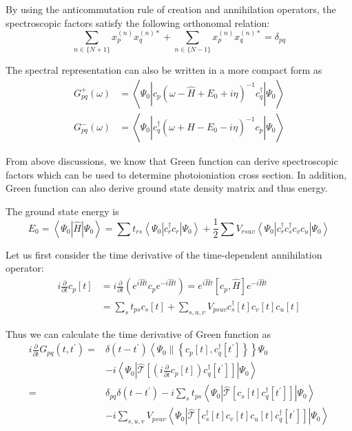 \documentclass[bachelor, english]{ustcthesis}
\begin{document}
By using the anticommutation rule of creation and annihilation operators, the spectroscopic factors satisfy the following orthonomal relation:
$$
\sum_{n \in\{N+1\}} x_{p}^{(n)} x_{q}^{(n) *}+\sum_{n \in\{N-1\}} x_{p}^{(n)} x_{q}^{(n) *}=\delta_{p q}
$$

The spectral representation can also be written in a more compact form as
$$
\begin{aligned} G_{p q}^{+}(\omega) &=\left\langle\Psi_{0}\left|c_{p}\left(\omega-\hat{H}+E_{0}+i \eta\right)^{-1} c_{q}^{\dagger}\right| \Psi_{0}\right\rangle \\ G_{p q}^{-}(\omega) &=\left\langle\Psi_{0}\left|c_{q}^{\dagger}\left(\omega+\hat{H}-E_{0}-i \eta\right)^{-1} c_{p}\right| \Psi_{0}\right\rangle \end{aligned}
$$

From above discussions, we know that Green function can derive spectroscopic factors which can be used to determine photoioniation cross section.
In addition, Green function can also derive ground state density matrix and thus energy.

The ground state energy is
$$
E_{0}=\left\langle\Psi_{0}|\hat{H}| \Psi_{0}\right\rangle=\sum t_{r s}\left\langle\Psi_{0}\left|c_{r}^{\dagger} c_{r}\right| \Psi_{0}\right\rangle+\frac{1}{2} \sum V_{r s u v}\left\langle\Psi_{0}\left|c_{r}^{\dagger} c_{s}^{\dagger} c_{v} c_{u}\right| \Psi_{0}\right\rangle
$$

Let us first consider the time derivative of the time-dependent annihilation operator:
$$
\begin{aligned}
	i \frac{\partial}{\partial t} c_{p}[t]&=i \frac{\partial}{\partial t}\left(e^{i \hat{H} t} c_{p} e^{-i \hat{H} t}\right)=e^{i \hat{H} t}\left[c_{p}, \hat{H}\right] e^{-i \hat{H} t}
	\\
	&=\sum_{s} t_{p s} c_{s}[t]+\sum_{s, u, v} V_{p s u v} c_{s}^{\dagger}[t] c_{v}[t] c_{u}[t]
\end{aligned}
$$

Thus we can calculate the time derivative of Green function as
$$
\begin{aligned} i \frac{\partial}{\partial t} G_{p q}\left(t, t^{\prime}\right)=& \delta\left(t-t^{\prime}\right)\left\langle\Psi_{0} \|\left\{c_{p}[t], c_{q}^{\dagger}\left[t^{\prime}\right]\right\}\right\} \Psi_{0} \\ &-i\left\langle\Psi_{0}\left|\hat{\mathcal{T}}\left[\left(i \frac{\partial}{\partial t} c_{p}[t]\right) c_{q}^{\dagger}\left[t^{\prime}\right]\right]\right| \Psi_{0}\right\rangle \\=& \delta_{p q} \delta\left(t-t^{\prime}\right)-i \sum_{s} t_{p s}\left\langle\Psi_{0}\left|\hat{\mathcal{T}}\left[c_{s}[t] c_{q}^{\dagger}\left[t^{\prime}\right]\right]\right| \Psi_{0}\right\rangle \\ &- i \sum_{s, u, v} V_{p s u v}\left\langle\Psi_{0}\left|\hat{\mathcal{T}}\left[c_{s}^{\dagger}[t] c_{v}[t] c_{u}[t] c_{q}^{\dagger}\left[t^{\prime}\right]\right]\right| \Psi_{0}\right\rangle \end{aligned}
$$
\end{document}

